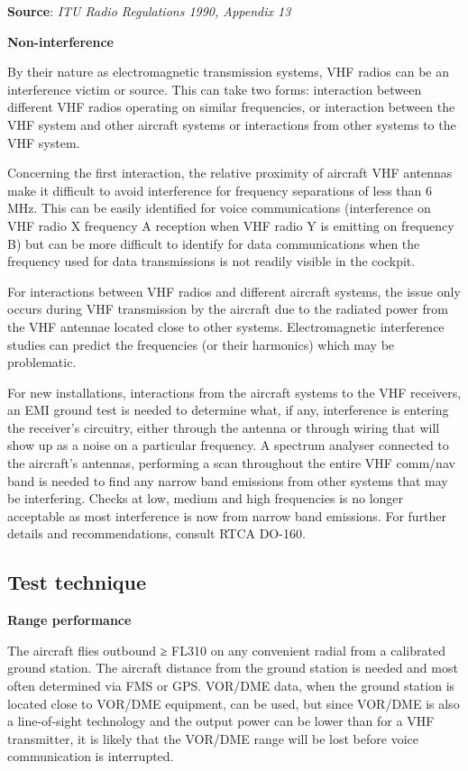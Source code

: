 \documentclass[
]{book}
\begin{document}
\textbf{Source}: \emph{ITU Radio Regulations 1990, Appendix 13}

\textbf{Non-interference}

By their nature as electromagnetic transmission systems, VHF radios can be an
interference victim or source. This can take two forms: interaction between
different VHF radios operating on similar frequencies, or interaction between
the VHF system and other aircraft systems or interactions from other systems to
the VHF system.

Concerning the first interaction, the relative proximity of aircraft VHF
antennas make it difficult to avoid interference for frequency separations of
less than 6 MHz. This can be easily identified for voice communications
(interference on VHF radio X frequency A reception when VHF radio Y is emitting
on frequency B) but can be more difficult to identify for data communications
when the frequency used for data transmissions is not readily visible in the
cockpit.

For interactions between VHF radios and different aircraft systems, the issue
only occurs during VHF transmission by the aircraft due to the radiated power
from the VHF antennae located close to other systems. Electromagnetic
interference studies can predict the frequencies (or their harmonics) which may
be problematic.

For new installations, interactions from the aircraft systems to the VHF
receivers, an EMI ground test is needed to determine what, if any, interference
is entering the receiver's circuitry, either through the antenna or through
wiring that will show up as a noise on a particular frequency. A spectrum
analyser connected to the aircraft's antennas, performing a scan throughout the
entire VHF comm/nav band is needed to find any narrow band emissions from other
systems that may be interfering. Checks at low, medium and high frequencies is
no longer acceptable as most interference is now from narrow band emissions.
For further details and recommendations, consult RTCA DO-160.

\hypertarget{test-technique}{%
\subsection{Test technique}\label{test-technique}}

\textbf{Range performance}

The aircraft flies outbound ≥ FL310 on any convenient radial from a calibrated
ground station. The aircraft distance from the ground station is needed and
most often determined via FMS or GPS. VOR/DME data, when the ground station is
located close to VOR/DME equipment, can be used, but since VOR/DME is also a
line-of-sight technology and the output power can be lower than for a VHF
transmitter, it is likely that the VOR/DME range will be lost before voice
communication is interrupted.
\end{document}
